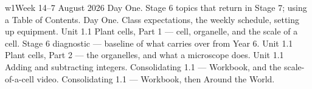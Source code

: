 \documentclass[11pt]{article}
\begin{document}
\clearpage
\renewcommand{\currentweek}{Week 1 \sep 4--7 August}

\begin{weekoverview}{w1}{Week 1}{4--7 August 2026}
  {Day One. Stage 6 topics that return in Stage 7; using a Table of Contents.}
  {Day One. Class expectations, the weekly schedule, setting up equipment.}
  {Unit 1.1 Plant cells, Part 1 --- cell, organelle, and the scale of a cell.}
  {Stage 6 diagnostic --- baseline of what carries over from Year 6.}
  {Unit 1.1 Plant cells, Part 2 --- the organelles, and what a microscope does.}
  {Unit 1.1 Adding and subtracting integers.}
  {Consolidating 1.1 --- Workbook, and the scale-of-a-cell video.}
  {Consolidating 1.1 --- Workbook, then Around the World.}
\end{weekoverview}

\begin{weeklinks}
\end{weeklinks}
\end{document}
